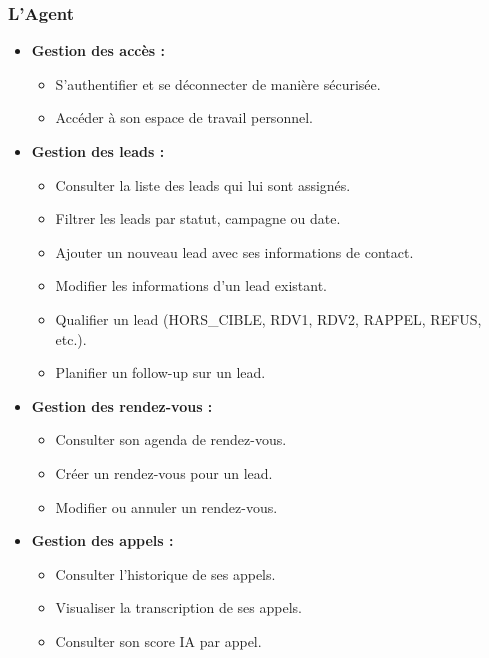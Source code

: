 \subsubsection{L'Agent}

\begin{itemize}[label=--, itemsep=3pt]
    \item \textbf{Gestion des accès :}
    \begin{itemize}[label=--, itemsep=2pt]
        \item S'authentifier et se déconnecter de manière sécurisée.
        \item Accéder à son espace de travail personnel.
    \end{itemize}

    \item \textbf{Gestion des leads :}
    \begin{itemize}[label=--, itemsep=2pt]
        \item Consulter la liste des leads qui lui sont assignés.
        \item Filtrer les leads par statut, campagne ou date.
        \item Ajouter un nouveau lead avec ses informations de contact.
        \item Modifier les informations d'un lead existant.
        \item Qualifier un lead (HORS_CIBLE, RDV1, RDV2, RAPPEL, REFUS, etc.).
        \item Planifier un follow-up sur un lead.
    \end{itemize}

    \item \textbf{Gestion des rendez-vous :}
    \begin{itemize}[label=--, itemsep=2pt]
        \item Consulter son agenda de rendez-vous.
        \item Créer un rendez-vous pour un lead.
        \item Modifier ou annuler un rendez-vous.
    \end{itemize}

    \item \textbf{Gestion des appels :}
    \begin{itemize}[label=--, itemsep=2pt]
        \item Consulter l'historique de ses appels.
        \item Visualiser la transcription de ses appels.
        \item Consulter son score IA par appel.
    \end{itemize}


\end{itemize}
